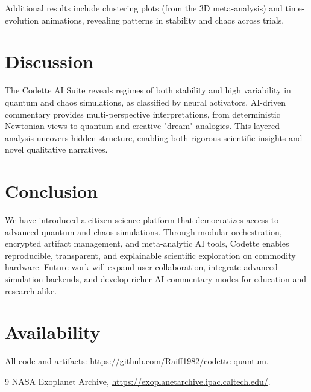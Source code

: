 \documentclass[11pt,a4paper]{article}
\begin{document}
Additional results include clustering plots (from the 3D meta-analysis) and time-evolution animations, revealing patterns in stability and chaos across trials.

\section{Discussion}
The Codette AI Suite reveals regimes of both stability and high variability in quantum and chaos simulations, as classified by neural activators. AI-driven commentary provides multi-perspective interpretations, from deterministic Newtonian views to quantum and creative "dream" analogies. This layered analysis uncovers hidden structure, enabling both rigorous scientific insights and novel qualitative narratives.

\section{Conclusion}
We have introduced a citizen-science platform that democratizes access to advanced quantum and chaos simulations. Through modular orchestration, encrypted artifact management, and meta-analytic AI tools, Codette enables reproducible, transparent, and explainable scientific exploration on commodity hardware. Future work will expand user collaboration, integrate advanced simulation backends, and develop richer AI commentary modes for education and research alike.

\section*{Availability}
All code and artifacts: \url{https://github.com/Raiff1982/codette-quantum}.


\begin{thebibliography}{9}
 NASA Exoplanet Archive, \url{https://exoplanetarchive.ipac.caltech.edu/}.
\end{thebibliography}
\end{document}
